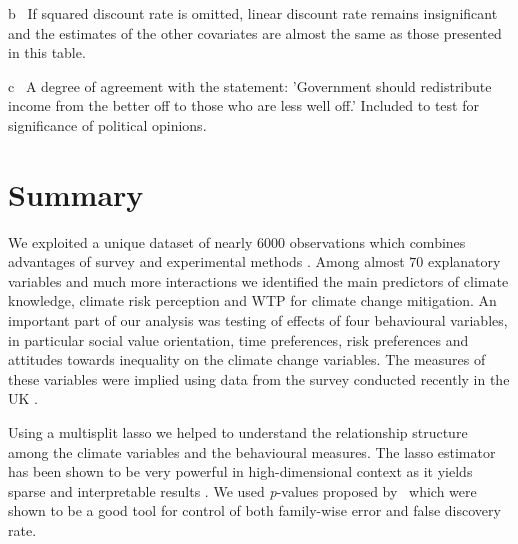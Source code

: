 \documentclass[a4paper,12pt]{article}
\begin{document}
{\begin{threeparttable}
\begin{tablenotes}
\begin{footnotesize}
\begin{adjustwidth}{0.9cm}{}
\item[b]~If squared discount rate is omitted, linear discount rate remains insignificant and the estimates of the other covariates are almost the same as those presented in this table.
\item[c]~A degree of agreement with the statement: 'Government should redistribute income from the better off to those who are less well off.' Included to test for significance of political opinions.
     \end{adjustwidth}       
\singlespacing
  \end{footnotesize}
\end{tablenotes}
  \end{threeparttable} 
\par}





\pagebreak






\section{Summary}\label{Summary}
We exploited a unique dataset of nearly $6000$ observations which combines advantages of survey and experimental methods \citep{SurveyUK}. Among almost $70$ explanatory variables and much more interactions we identified the main predictors of climate knowledge, climate risk perception and WTP for climate change mitigation. An important part of our analysis was testing of effects of four behavioural variables, in particular social value orientation, time preferences, risk preferences and attitudes towards
inequality on the climate change variables. The measures of these variables were implied using data from the survey conducted recently in the UK 
\citep{SurveyUK}.

Using a multisplit lasso we helped to understand the relationship structure among the climate variables and the behavioural measures. The lasso estimator has been shown to be very powerful in high-dimensional context as it yields sparse and interpretable results \citep{pValsLasso}. We used \textit{p}-values proposed by~\citet{pValsLasso} which were shown to be a good tool for control of both family-wise error and false discovery rate.
\end{document}
